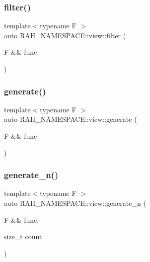 \mbox{\label{namespace_r_a_h___n_a_m_e_s_p_a_c_e_1_1view_a45acfa62cf05ef407a766b6c038b06cd}} 
\subsubsection{\texorpdfstring{filter()}{filter()}\hspace{0.1cm}{\footnotesize\ttfamily [2/2]}}
{\footnotesize\ttfamily template$<$typename F $>$ \\
auto R\+A\+H\+\_\+\+N\+A\+M\+E\+S\+P\+A\+C\+E\+::view\+::filter (\begin{DoxyParamCaption}\item[{F \&\&}]{func }\end{DoxyParamCaption})}

\mbox{\label{namespace_r_a_h___n_a_m_e_s_p_a_c_e_1_1view_a8f775415ab56d1024c456a3941504a4e}} 
\subsubsection{\texorpdfstring{generate()}{generate()}}
{\footnotesize\ttfamily template$<$typename F $>$ \\
auto R\+A\+H\+\_\+\+N\+A\+M\+E\+S\+P\+A\+C\+E\+::view\+::generate (\begin{DoxyParamCaption}\item[{F \&\&}]{func }\end{DoxyParamCaption})}

\mbox{\label{namespace_r_a_h___n_a_m_e_s_p_a_c_e_1_1view_a9f7fb766d26e6d8016b650e166a5dbd5}} 
\subsubsection{\texorpdfstring{generate\_n()}{generate\_n()}}
{\footnotesize\ttfamily template$<$typename F $>$ \\
auto R\+A\+H\+\_\+\+N\+A\+M\+E\+S\+P\+A\+C\+E\+::view\+::generate\+\_\+n (\begin{DoxyParamCaption}\item[{F \&\&}]{func,  }\item[{size\+\_\+t}]{count }\end{DoxyParamCaption})}

